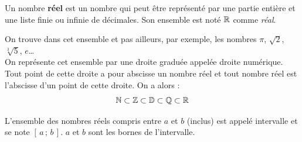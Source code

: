 \begin{definition}
   Un nombre \textbf{réel} est un nombre qui peut être représenté par une partie entière et une liste finie ou infinie de décimales. Son ensemble est noté ${\mathbb R}$ comme \textit{réal}. \smallskip
\end{definition}

\medskip

On trouve dans cet ensemble et pas ailleurs, par exemple, les nombres $\pi$, $\sqrt2$, $\sqrt[3]{5}$, $e$\dots \\
On représente cet ensemble par une droite graduée appelée droite numérique. Tout point de cette droite a pour abscisse un nombre réel et tout nombre réel est l'abscisse d'un point de cette droite. On a alors :
$${\mathbb N} \subset {\mathbb Z} \subset {\mathbb D} \subset {\mathbb Q} \subset {\mathbb R}$$

\smallskip

\begin{definition}[Intervalle]
   L’ensemble des nombres réels compris entre $a$ et $b$ (inclus) est appelé intervalle et se note $[\,a\,;\,b\,]$. $a$ et $b$ sont les bornes de l’intervalle.
\end{definition}

\medskip

